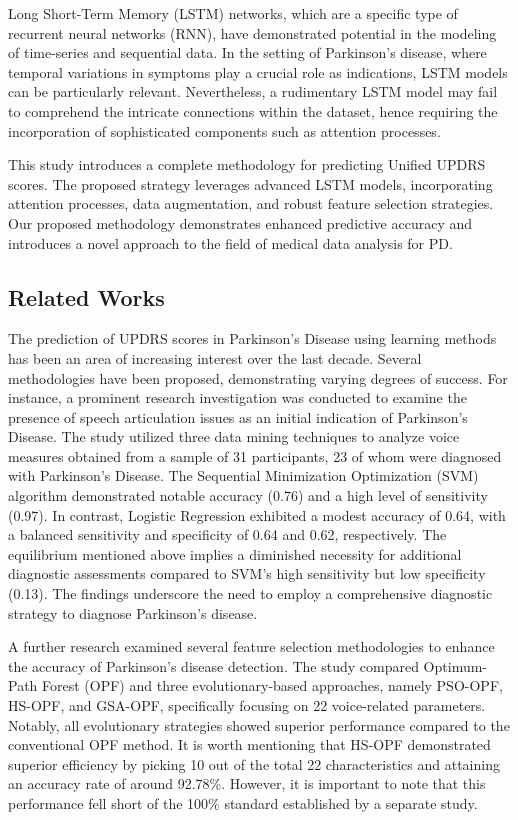 Long Short-Term Memory (LSTM) networks, which are a specific type of recurrent neural networks (RNN), have demonstrated potential in the modeling of time-series and sequential data. In the setting of Parkinson's disease, where temporal variations in symptoms play a crucial role as indications, LSTM models can be particularly relevant. Nevertheless, a rudimentary LSTM model may fail to comprehend the intricate connections within the dataset, hence requiring the incorporation of sophisticated components such as attention processes.

This study introduces a complete methodology for predicting Unified UPDRS scores. The proposed strategy leverages advanced LSTM models, incorporating attention processes, data augmentation, and robust feature selection strategies. Our proposed methodology demonstrates enhanced predictive accuracy and introduces a novel approach to the field of medical data analysis for PD.



\subsection{Related Works}
The prediction of UPDRS scores in Parkinson's Disease using learning methods has been an area of increasing interest over the last decade. Several methodologies have been proposed, demonstrating varying degrees of success. For instance, a prominent research\cite{13} investigation was conducted to examine the presence of speech articulation issues as an initial indication of Parkinson's Disease. The study utilized three data mining techniques to analyze voice measures obtained from a sample of 31 participants, 23 of whom were diagnosed with Parkinson's Disease. The Sequential Minimization Optimization (SVM) algorithm demonstrated notable accuracy (0.76) and a high level of sensitivity (0.97). In contrast, Logistic Regression exhibited a modest accuracy of 0.64, with a balanced sensitivity and specificity of 0.64 and 0.62, respectively. The equilibrium mentioned above implies a diminished necessity for additional diagnostic assessments compared to SVM's high sensitivity but low specificity (0.13). The findings underscore the need to employ a comprehensive diagnostic strategy to diagnose Parkinson's disease.

A further research\cite{14} examined several feature selection methodologies to enhance the accuracy of Parkinson's disease detection. The study compared Optimum-Path Forest (OPF) and three evolutionary-based approaches, namely PSO-OPF, HS-OPF, and GSA-OPF, specifically focusing on 22 voice-related parameters. Notably, all evolutionary strategies showed superior performance compared to the conventional OPF method. It is worth mentioning that HS-OPF demonstrated superior efficiency by picking 10 out of the total 22 characteristics and attaining an accuracy rate of around 92.78\%. However, it is important to note that this performance fell short of the 100\% standard established by a separate study.


